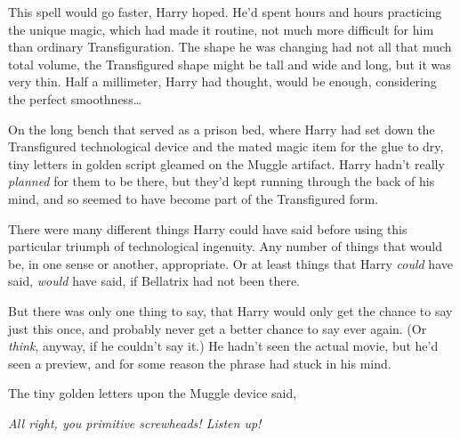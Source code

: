 This spell would go faster, Harry hoped. He'd spent hours and hours practicing the unique magic, which had made it routine, not much more difficult for him than ordinary Transfiguration. The shape he was changing had not all that much total volume, the Transfigured shape might be tall and wide and long, but it was very thin. Half a millimeter, Harry had thought, would be enough, considering the perfect smoothness{\ldots}

On the long bench that served as a prison bed, where Harry had set down the Transfigured technological device and the mated magic item for the glue to dry, tiny letters in golden script gleamed on the Muggle artifact. Harry hadn't really \emph{planned} for them to be there, but they'd kept running through the back of his mind, and so seemed to have become part of the Transfigured form.

There were many different things Harry could have said before using this particular triumph of technological ingenuity. Any number of things that would be, in one sense or another, appropriate. Or at least things that Harry \emph{could} have said, \emph{would} have said, if Bellatrix had not been there.

But there was only one thing to say, that Harry would only get the chance to say just this once, and probably never get a better chance to say ever again. (Or \emph{think}, anyway, if he couldn't say it.) He hadn't seen the actual movie, but he'd seen a preview, and for some reason the phrase had stuck in his mind.

The tiny golden letters upon the Muggle device said,\nopagebreak

\emph{All right, you primitive screwheads! Listen up!}

